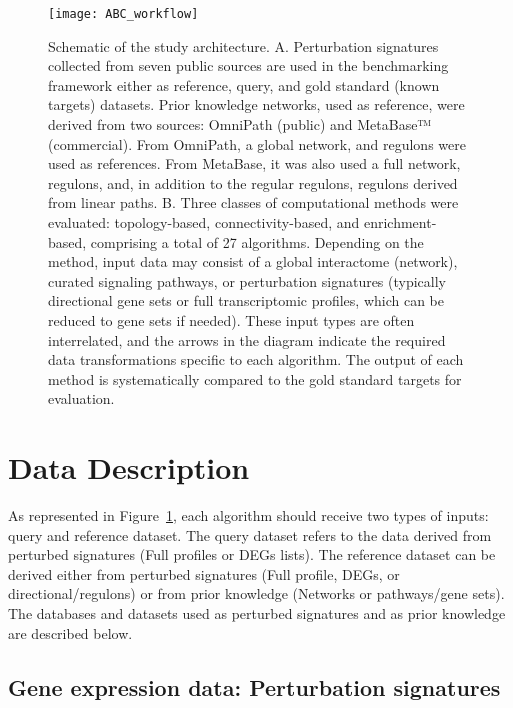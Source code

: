 \begin{figure}[htbp]
    \centering
    \texttt{[image: ABC\_workflow]}
    \caption{Schematic of the study architecture. A. Perturbation signatures collected from seven public sources are used in the benchmarking framework either as reference, query, and gold standard (known targets) datasets. Prior knowledge networks, used as reference, were derived from two sources: OmniPath (public) and MetaBase™ (commercial). From OmniPath, a global network, and regulons were used as references. From MetaBase, it was also used a full network, regulons, and, in addition to the regular regulons, regulons derived from linear paths. B. Three classes of computational methods were evaluated: topology-based, connectivity-based, and enrichment-based, comprising a total of 27 algorithms. Depending on the method, input data may consist of a global interactome (network), curated signaling pathways, or perturbation signatures (typically directional gene sets or full transcriptomic profiles, which can be reduced to gene sets if needed). These input types are often interrelated, and the arrows in the diagram indicate the required data transformations specific to each algorithm. The output of each method is systematically compared to the gold standard targets for evaluation.}
    \label{fig:fig4}
\end{figure}



\section{Data Description} %
\label{sec:data_description}

As represented in Figure~\ref{fig:fig4}, each algorithm should receive two types of inputs: query and reference dataset. The query dataset refers to the data derived from perturbed signatures (Full profiles or DEGs lists). The reference dataset can be derived either from perturbed signatures (Full profile, DEGs, or directional/regulons) or from prior knowledge (Networks or pathways/gene sets). The databases and datasets used as perturbed signatures and as prior knowledge are described below.

\subsection{Gene expression data: Perturbation signatures}
\label{sub:gene_expression_data_perturbation_signatures}

